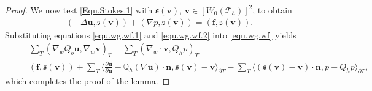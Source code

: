 \documentclass[final,leqno]{siamltex704}
\def\S{{\mathfrak s}}
\def\T{{\mathcal T}}
\begin{document}
\begin{proof}
We now test \eqref{Equ.Stokes.1} with $\S(\bm{v})$, $\bm{v} \in [W_0(\T_h)]^2$, to obtain
\begin{eqnarray}\label{equ.wg.wf}
(-\Delta \bm{u}, \S(\bm{v}) ) + (\nabla p, \S(\bm{v})) =(\bm{f}, \S(\bm{v})).
\end{eqnarray}
Substituting equations \eqref{equ.wg.wf.1} and \eqref{equ.wg.wf.2} into \eqref{equ.wg.wf} yields
\begin{eqnarray*}
& & \sum_{T}(\nabla_w Q_b \bm{u},\nabla_w \bm{v})_T - \sum_{T}(\nabla_w\cdot\bm{v}, Q_h p )_{T}\\
&= &(\bm{f}, \S(\bm{v})) + \sum_{T}\langle \frac{\partial \bm{u}}{\partial \bm{n}}- \mathbb{Q}_h(\nabla \bm{u})\cdot\bm{n},\S(\bm{v})-\bm{v}\rangle_{\partial T}
- \sum_{T} \langle (\S(\bm{v})-\bm{v})\cdot \bm{n},p - Q_h p\rangle_{\partial T}, \nonumber
\end{eqnarray*}
which completes the proof of the lemma.
\end{proof}
\end{document}
